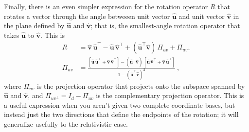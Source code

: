 \documentclass{article}
\newcommand{\proj}{\mathsf{\Pi}}
\newcommand{\Ehat}[1]{{\mathbf{\hat{#1}}}} %
\begin{document}
Finally, there is an even simpler expression for the rotation operator $R$ that rotates a vector through the angle betweeen unit vector $\Ehat{u}$ and unit vector $\Ehat{v}$ in the plane defined by $\Ehat{u}$ and $\Ehat{v}$; that is, the smallest-angle rotation operator that takes $\Ehat{u}$ to $\Ehat{v}$.
This is
\begin{align}
    R &= \Ehat{v}\,\Ehat{u}^\top - \Ehat{u}\,\Ehat{v}^\top + (\Ehat{u}^\top\Ehat{v})\,\proj_{uv} + \proj_{uv^\perp} \label{eq:vecs2rot} \\
    \proj_{uv} &= \frac{[\Ehat{u}\,\Ehat{u}^\top + \Ehat{v}\,\Ehat{v}^\top] - (\Ehat{u}^\top\Ehat{v})\,[\Ehat{u}\,\Ehat{v}^\top + \Ehat{v}\,\Ehat{u}^\top]}{1 - (\Ehat{u}^\top\Ehat{v})^2} ~,
\end{align}
where $\proj_{uv}$ is the projection operator that projects onto the subspace spanned by $\Ehat{u}$ and $\Ehat{v}$, and $\proj_{uv^\perp} = I_d - \proj_{uv}$ is the complementary projection operator.
This is a useful expression when you aren't given two complete coordinate bases, but instead just the two directions that define the endpoints of the rotation; it will generalize usefully to the relativistic case.
\end{document}

